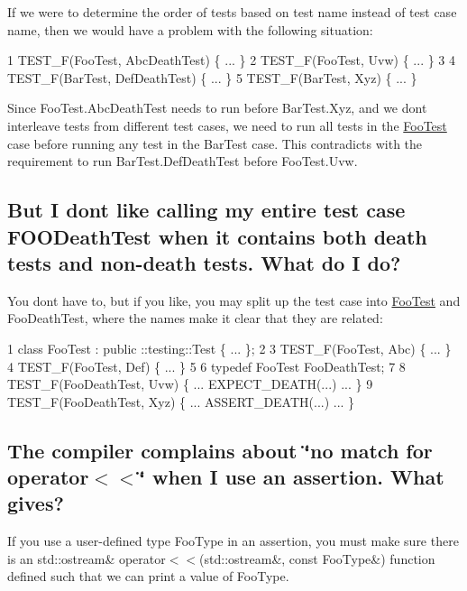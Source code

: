 If we were to determine the order of tests based on test name instead of test case name, then we would have a problem with the following situation\+:


\begin{DoxyCode}
1 TEST\_F(FooTest, AbcDeathTest) \{ ... \}
2 TEST\_F(FooTest, Uvw) \{ ... \}
3 
4 TEST\_F(BarTest, DefDeathTest) \{ ... \}
5 TEST\_F(BarTest, Xyz) \{ ... \}
\end{DoxyCode}


Since {\ttfamily Foo\+Test.\+Abc\+Death\+Test} needs to run before {\ttfamily Bar\+Test.\+Xyz}, and we don\textquotesingle{}t interleave tests from different test cases, we need to run all tests in the {\ttfamily \hyperlink{classFooTest}{Foo\+Test}} case before running any test in the {\ttfamily Bar\+Test} case. This contradicts with the requirement to run {\ttfamily Bar\+Test.\+Def\+Death\+Test} before {\ttfamily Foo\+Test.\+Uvw}.

\subsection*{But I don\textquotesingle{}t like calling my entire test case F\+O\+O\+Death\+Test when it contains both death tests and non-\/death tests. What do I do?}

You don\textquotesingle{}t have to, but if you like, you may split up the test case into {\ttfamily \hyperlink{classFooTest}{Foo\+Test}} and {\ttfamily Foo\+Death\+Test}, where the names make it clear that they are related\+:


\begin{DoxyCode}
1 class FooTest : public ::testing::Test \{ ... \};
2 
3 TEST\_F(FooTest, Abc) \{ ... \}
4 TEST\_F(FooTest, Def) \{ ... \}
5 
6 typedef FooTest FooDeathTest;
7 
8 TEST\_F(FooDeathTest, Uvw) \{ ... EXPECT\_DEATH(...) ... \}
9 TEST\_F(FooDeathTest, Xyz) \{ ... ASSERT\_DEATH(...) ... \}
\end{DoxyCode}


\subsection*{The compiler complains about \char`\"{}no match for \textquotesingle{}operator$<$$<$\textquotesingle{}\char`\"{} when I use an assertion. What gives?}

If you use a user-\/defined type {\ttfamily Foo\+Type} in an assertion, you must make sure there is an {\ttfamily std\+::ostream\& operator$<$$<$(std\+::ostream\&, const Foo\+Type\&)} function defined such that we can print a value of {\ttfamily Foo\+Type}.

